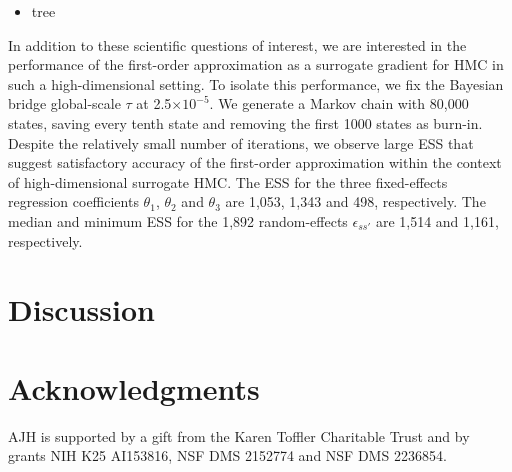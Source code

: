 \documentclass[12pt]{article} %
\begin{document}
\begin{itemize}
	\item tree
\end{itemize}

In addition to these scientific questions of interest, we are interested in the performance of the first-order approximation as a surrogate gradient for HMC in such a high-dimensional setting. To isolate this performance, we fix the Bayesian bridge global-scale $\tau$ at 2.5$\times10^{-5}$.  We generate a Markov chain with 80,000 states, saving every tenth state and removing the first 1000 states as burn-in.  Despite the relatively small number of iterations, we observe large ESS that suggest satisfactory accuracy of the first-order approximation within the context of high-dimensional surrogate HMC.  The ESS for the three fixed-effects regression coefficients $\theta_1$, $\theta_2$ and $\theta_3$ are 1,053, 1,343 and 498, respectively.  The median and minimum ESS for the 1,892 random-effects $\epsilon_{ss'}$ are 1,514 and 1,161, respectively.


\section{Discussion}


\section*{Acknowledgments}

AJH is supported by a gift from the Karen Toffler Charitable Trust and by grants NIH K25 AI153816, NSF DMS 2152774 and NSF DMS 2236854.
\end{document}
